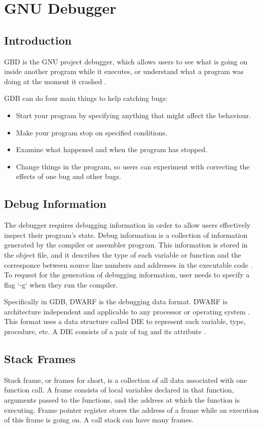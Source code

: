 \chapter{GNU Debugger} \label{GDB}

\section{Introduction}
GBD is the GNU project debugger, which allows users to see what is going on
inside another program while it executes, or understand what a program was
doing at the moment it crashed \cite{reference3}.

GDB can do four main things to help catching bugs:
\begin{itemize}
\item Start your program by specifying anything that might affect the
behaviour.
\item Make your program stop on specified conditions.
\item Examine what happened and when the program has stopped.
\item Change things in the program, so users can experiment with correcting the
effects of one bug and other bugs.
\end{itemize}

\section{Debug Information}
The debugger requires debugging information in order to allow users effectively inspect
their program's state. Debug information is a collection of information
generated by the compiler or assembler program. This information is stored in
the object file, and it describes the type of each variable or function and
the corresponce between source line numbers and addresses in the executable
code \cite{reference6}. To request for the generation of debugging information,
user needs to specify a flag `-g` when they run the compiler.

Specifically in GDB, DWARF is the debugging data format. DWARF is architecture
independent and applicable to any processor or operating system
\cite{reference7}. This format uses a data structure called DIE to represent
each variable, type, procedure, etc. A DIE consists of a pair of tag
and its attribute \cite{reference8}.

\section{Stack Frames}
Stack frame, or frames for short, is a collection of all data associated with
one function call. A frame consists of local variables declared in that
function, arguments passed to the functions, and the address at which the
function is executing. Frame pointer register stores the address of a frame
while an execution of this frame is going on. A call stack can have many frames.

